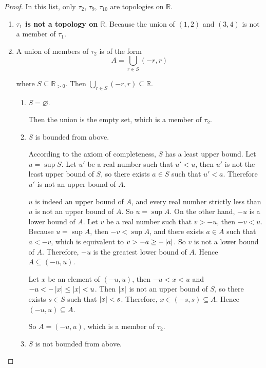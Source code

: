 \begin{proof}
    In this list, only $\tau_{2}$, $\tau_{9}$, $\tau_{10}$ are topologies on $\mathbb{R}$.

    \begin{enumerate}[label={(\roman*)}]
        \item \textbf{$\tau_{1}$ is not a topology on $\mathbb{R}$}. Because the union of $(1, 2)$ and $(3, 4)$ is not a member of $\tau_{1}$.
        \item A union of members of $\tau_{2}$ is of the form
              \[
                  A = \bigcup_{r\in S} (-r, r)
              \]

              where $S\subseteq \mathbb{R}_{> 0}$. Then $\bigcup_{r\in S} (-r, r)\subseteq \mathbb{R}$.
              \begin{enumerate}[label={\textbf{Case \arabic*.}},itemindent=1cm]
                  \item $S = \varnothing$.

                        Then the union is the empty set, which is a member of $\tau_{2}$.
                  \item $S$ is bounded from above.

                        According to the axiom of completeness, $S$ has a least upper bound. Let $u = \sup S$. Let $u'$ be a real number such that $u' < u$, then $u'$ is not the least upper bound of $S$, so there exists $a\in S$ such that $u' < a$. Therefore $u'$ is not an upper bound of $A$.

                        $u$ is indeed an upper bound of $A$, and every real number strictly less than $u$ is not an upper bound of $A$. So $u = \sup A$. On the other hand, $-u$ is a lower bound of $A$. Let $v$ be a real number such that $v > -u$, then $-v < u$. Because $u = \sup A$, then $-v < \sup A$, and there exists $a\in A$ such that $a < -v$, which is equivalent to $v > -a\geq -\left\vert{a}\right\vert$. So $v$ is not a lower bound of $A$. Therefore, $-u$ is the greatest lower bound of $A$. Hence $A \subseteq (-u, u)$.

                        Let $x$ be an element of $(-u, u)$, then $-u < x < u$ and $-u < -\left\vert{x}\right\vert\leq \left\vert{x}\right\vert < u$. Then $\left\vert{x}\right\vert$ is not an upper bound of $S$, so there exists $s\in S$ such that $\left\vert{x}\right\vert < s$. Therefore, $x\in (-s, s)\subseteq A$. Hence $(-u, u)\subseteq A$.

                        So $A = (-u, u)$, which is a member of $\tau_{2}$.
                  \item $S$ is not bounded from above.


\end{enumerate}
\end{enumerate}
\end{proof}
